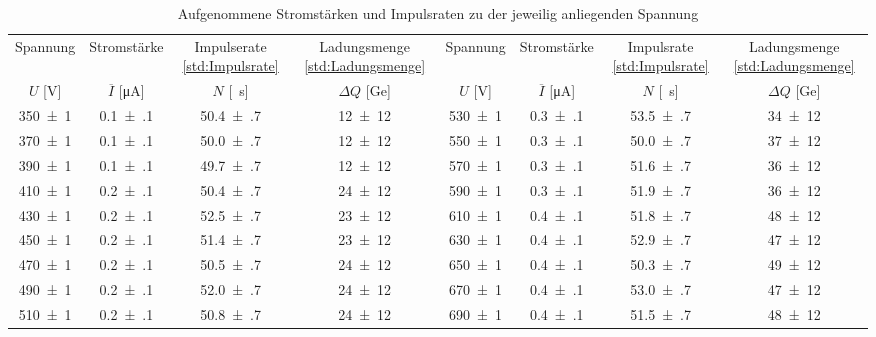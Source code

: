 \begin{table}[!h]
	\centering
	\begin{adjustbox}{width=\textwidth, center}
	\begin{tabular}{|c|c|c|c||c|c|c|c|}
		\hline
		Spannung & Stromstärke & Impulserate \cref{std:Impulsrate}& Ladungsmenge \cref{std:Ladungsmenge} & Spannung & Stromstärke & Impulsrate \cref{std:Impulsrate} & Ladungsmenge \cref{std:Ladungsmenge}\\
		$U$ [\si{\volt}] & $\overline{I}$ [\si{\micro\ampere}] & $N$ [\si{\per\second}] & $\Delta Q$ [\si{\giga e}] & $U$ [\si{\volt}] & $\overline{I}$ [\si{\micro\ampere}] & $N$ [\si{\per\second}] & $\Delta Q$ [\si{\giga e}]\\
\hline\hline
		\num{350(1)} & \num{0.1(1)} & \num{50.4(7)} & \num{12(12)} & \num{530(1)} & \num{0.3(1)} & \num{53.5(7)} & \num{34(12)}\\
		\num{370(1)} & \num{0.1(1)} & \num{50.0(7)} & \num{12(12)} & \num{550(1)} & \num{0.3(1)} & \num{50.0(7)} & \num{37(12)}\\
		\num{390(1)} & \num{0.1(1)} & \num{49.7(7)} & \num{12(12)} & \num{570(1)} & \num{0.3(1)} & \num{51.6(7)} & \num{36(12)}\\
		\num{410(1)} & \num{0.2(1)} & \num{50.4(7)} & \num{24(12)} & \num{590(1)} & \num{0.3(1)} & \num{51.9(7)} & \num{36(12)}\\
		\num{430(1)} & \num{0.2(1)} & \num{52.5(7)} & \num{23(12)} & \num{610(1)} & \num{0.4(1)} & \num{51.8(7)} & \num{48(12)}\\
		\num{450(1)} & \num{0.2(1)} & \num{51.4(7)} & \num{23(12)} & \num{630(1)} & \num{0.4(1)} & \num{52.9(7)} & \num{47(12)}\\
		\num{470(1)} & \num{0.2(1)} & \num{50.5(7)} & \num{24(12)} & \num{650(1)} & \num{0.4(1)} & \num{50.3(7)} & \num{49(12)}\\
		\num{490(1)} & \num{0.2(1)} & \num{52.0(7)} & \num{24(12)} & \num{670(1)} & \num{0.4(1)} & \num{53.0(7)} & \num{47(12)}\\
		\num{510(1)} & \num{0.2(1)} & \num{50.8(7)} & \num{24(12)} & \num{690(1)} & \num{0.4(1)} & \num{51.5(7)} & \num{48(12)}\\
		\hline
	\end{tabular}
	\end{adjustbox}
	\caption{Aufgenommene Stromstärken und Impulsraten zu der jeweilig anliegenden Spannung \label{tab:Auswertung_Ladungsmenge}}
\end{table}
















